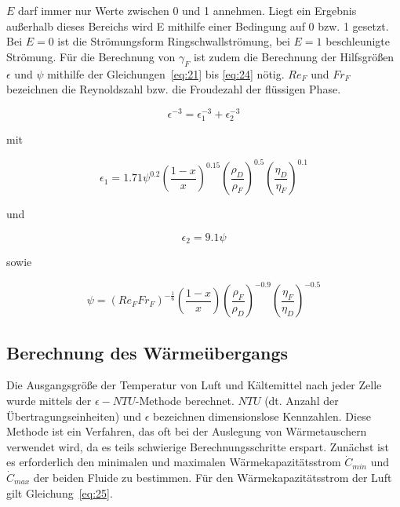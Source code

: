 $E$ darf immer nur Werte zwischen 0 und 1 annehmen. Liegt ein Ergebnis außerhalb dieses Bereichs wird E mithilfe einer Bedingung auf 0 bzw. 1 gesetzt. Bei $E=0$ ist die Strömungsform Ringschwallströmung, bei $E=1$ beschleunigte Strömung.
Für die Berechnung von $\gamma_F$ ist zudem die Berechnung der Hilfsgrößen $\epsilon$ und $\psi$ mithilfe der Gleichungen~\ref{eq:21} bis \ref{eq:24} nötig. $Re_F$ und $Fr_F$ bezeichnen die Reynoldszahl bzw. die Froudezahl der flüssigen Phase.

\begin{equation}
\label{eq:21}
\epsilon^{-3} = \epsilon_1^{-3} + \epsilon_2^{-3}
\end{equation}

mit

\begin{equation}
\label{eq:22}
\epsilon_1 = 1.71 \psi^{0.2} \left( \frac{1-x}{x} \right)^{0.15} \left( \frac{\rho_D}{\rho_F} \right)^{0.5} \left( \frac{\eta_D}{\eta_F} \right)^{0.1}
\end{equation}

und

\begin{equation}
\label{eq:23}
\epsilon_2 = 9.1 \psi
\end{equation}

sowie

\begin{equation}
\label{eq:24}
\psi = (Re_F Fr_F)^{-\frac{1}{6}} \left( \frac{1-x}{x} \right) \left(\frac{\rho_F}{\rho_D} \right)^{-0.9} \left(\frac{\eta_F}{\eta_D} \right)^{-0.5}
\end{equation}

\subsection{Berechnung des Wärmeübergangs}
\label{subsec:Berechnung des Wärmeübergangs}

Die Ausgangsgröße der Temperatur von Luft und Kältemittel nach jeder Zelle wurde mittels der $\epsilon-NTU$-Methode berechnet\cite{SpringerVerlagGmbH.2013}\cite{Bergman.2011}\cite{Nellis.2009}. $NTU$ (dt. Anzahl der Übertragungseinheiten) und $\epsilon$ bezeichnen dimensionslose Kennzahlen. Diese Methode ist ein Verfahren, das oft bei der Auslegung von Wärmetauschern verwendet wird, da es teils schwierige Berechnungsschritte erspart. Zunächst ist es erforderlich den minimalen und maximalen Wärmekapazitätsstrom $\dot{C}_{min}$ und $\dot{C}_{max}$ der beiden Fluide zu bestimmen. Für den Wärmekapazitätsstrom der Luft gilt Gleichung~\ref{eq:25}.

